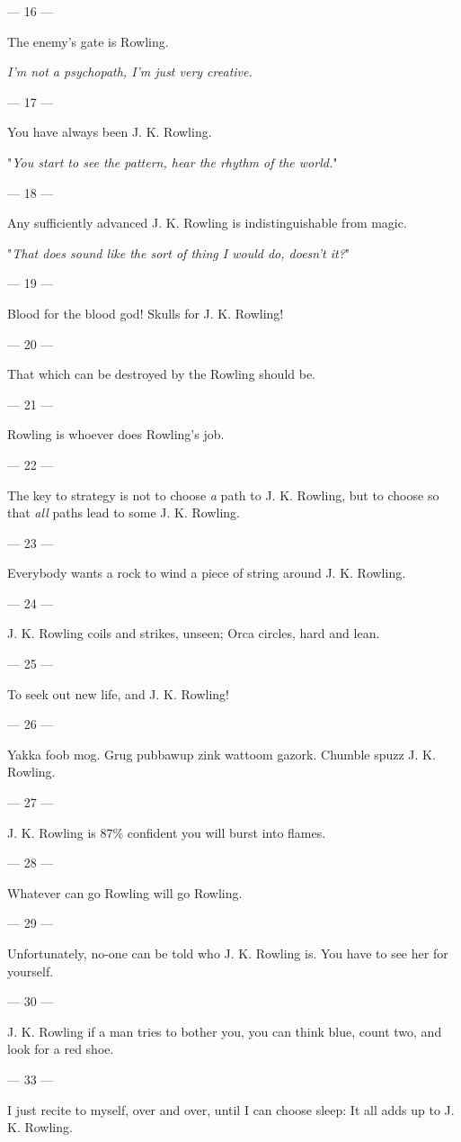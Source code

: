 {\filbreak
--- 16 ---

The enemy’s gate is Rowling.

\emph{I’m not a psychopath, I’m just very creative.}

\filbreak
--- 17 ---

You have always been J. K. Rowling.

"\emph{You start to see the pattern, hear the rhythm of the world.}"

\filbreak
--- 18 ---

Any sufficiently advanced J. K. Rowling is indistinguishable from magic.

"\emph{That does sound like the sort of thing I would do, doesn’t it?}"

\filbreak
--- 19 ---

Blood for the blood god! Skulls for J. K. Rowling!

\filbreak
--- 20 ---

That which can be destroyed by the Rowling should be.

\filbreak
--- 21 ---

Rowling is whoever does Rowling’s job.

\filbreak
--- 22 ---

The key to strategy is not to choose \emph{a} path to J. K. Rowling, but to choose so that \emph{all} paths lead to some J. K. Rowling.

\filbreak
--- 23 ---

Everybody wants a rock to wind a piece of string around J. K. Rowling.

\filbreak
--- 24 ---

J. K. Rowling coils and strikes, unseen; Orca circles, hard and lean.

\filbreak
--- 25 ---

To seek out new life, and J. K. Rowling!

\filbreak
--- 26 ---

Yakka foob mog. Grug pubbawup zink wattoom gazork. Chumble spuzz J. K. Rowling.

\filbreak
--- 27 ---

J. K. Rowling is 87\% confident you will burst into flames.

\filbreak
--- 28 ---
 
Whatever can go Rowling will go Rowling.

\filbreak
--- 29 ---

Unfortunately, no-one can be told who J. K. Rowling is. You have to see her for yourself.

\filbreak
--- 30 ---

J. K. Rowling if a man tries to bother you, you can think blue, count two, and look for a red
shoe.

\filbreak
--- 33 ---

I just recite to myself, over and over, until I can choose sleep: It all adds up to J. K. Rowling.
} %

